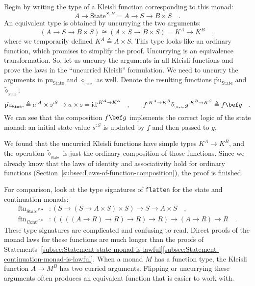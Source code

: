 Begin by writing the type of a Kleisli function corresponding to this
monad:
\[
A\rightarrow\text{State}^{S,B}=A\rightarrow S\rightarrow B\times S\quad.
\]
An equivalent type is obtained by uncurrying the two arguments:
\[
\left(A\rightarrow S\rightarrow B\times S\right)\cong\left(A\times S\rightarrow B\times S\right)=K^{A}\rightarrow K^{B}\quad,
\]
where we temporarily defined $K^{A}\triangleq A\times S$. This type
looks like an ordinary function, which promises to simplify the proof.
Uncurrying is an equivalence transformation. So, let us uncurry the
arguments in all Kleisli functions and prove the laws in the \textsf{``}uncurried
Kleisli\textsf{''} formulation. We need to uncurry the arguments in $\text{pu}_{\text{State}}$
and $\diamond_{_{\text{State}}}$ as well. Denote the resulting functions
$\tilde{\text{pu}}_{\text{State}}$ and $\tilde{\diamond}_{_{\text{State}}}$:
\[
\tilde{\text{pu}}_{\text{State}}\triangleq a^{:A}\times s^{:S}\rightarrow a\times s=\text{id}^{:K^{A}\rightarrow K^{A}}\quad,\quad\quad f^{:K^{A}\rightarrow K^{B}}\tilde{\diamond}_{_{\text{State}}}g^{:K^{B}\rightarrow K^{C}}\triangleq f\bef g\quad.
\]
We can see that the composition $f\bef g$ implements the correct
logic of the state monad: an initial state value $s^{:S}$ is updated
by $f$ and then passed to $g$.

We found that the uncurried Kleisli functions have simple types $K^{A}\rightarrow K^{B}$,
and the operation $\tilde{\diamond}_{_{\text{State}}}$ is just the
ordinary composition of those functions. Since we already know that
the laws of identity and associativity hold for ordinary functions
(Section~\ref{subsec:Laws-of-function-composition}), the proof is
finished.

For comparison, look at the type signatures of \lstinline!flatten!
for the state and continuation monads:
\begin{align*}
\text{ftn}_{\text{State}^{S,\bullet}} & :\left(S\rightarrow\left(S\rightarrow A\times S\right)\times S\right)\rightarrow S\rightarrow A\times S\quad,\\
\text{ftn}_{\text{Cont}^{R,\bullet}} & :\left(\left(\left(\left(A\rightarrow R\right)\rightarrow R\right)\rightarrow R\right)\rightarrow R\right)\rightarrow\left(A\rightarrow R\right)\rightarrow R\quad.
\end{align*}
These type signatures are complicated and confusing to read. Direct
proofs of the monad laws for these functions are much longer than
the proofs of Statements~\ref{subsec:Statement-state-monad-is-lawful}\textendash \ref{subsec:Statement-continuation-monad-is-lawful}.
When a monad $M$ has a function type, the Kleisli function $A\rightarrow M^{B}$
has two curried arguments. Flipping or uncurrying these arguments
often produces an equivalent function that is easier to work with. 

